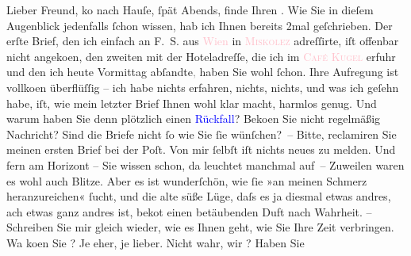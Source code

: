 \pstart
           Lieber Freund, ko{\geminationm} nach
               Hauſe, ſpät Abends, finde Ihren \label{K_L02951-1v}\label{K_L02951-1h}. Wie Sie in dieſem Augenblick jedenfalls ſchon wissen, hab ich Ihnen bereits
               2mal geſchrieben. Der erſte {\pb}Brief, den ich
               einfach an \textsc{F. S.} aus \textcolor{pink}{Wien}{}\ledrightnote{\textcolor{pink}{Wien}} in \textsc{\textcolor{pink}{Miskolez}{}\ledrightnote{\textcolor{pink}{Miskolc}}} adreſſirte, iſt offenbar nicht angeko{\geminationm}en, den
               zweiten mit der Hoteladreſſe, die ich im \textsc{\textcolor{pink}{Café Kugel}{}\ledrightnote{\textcolor{pink}{Café Kugel}}} erfuhr und den ich heute{ }Vormittag abſandte\textcolor{gray}{,} haben Sie wohl ſchon. Ihre
               Aufregung ist vollko{\geminationm}en {\pb}überflüſſig – ich habe nichts erfahren,
               nichts, nichts, und was ich geſehn habe, iſt, wie mein letzter Brief Ihnen wohl klar
               macht, harmlos genug. Und warum haben Sie denn plötzlich einen \textcolor{blue}{Rückfall}{}\ledrightnote{{$\rightarrow$}\textcolor{blue}{Bertha Karlsburg}}? Beko{\geminationm}en­ Sie nicht regelmäßig Nachricht? {\pb}Sind die Briefe nicht ſo wie Sie ſie
               wünſchen? – Bitte, reclamiren Sie meinen ersten Brief bei der Poſt. Von mir ſelbſt iſt
               nichts neues zu melden. Und fern am Horizont – Sie wissen schon, da leuchtet {\pb}\label{K_L02951-2v}\label{K_L02951-2h} manchmal
                  auf{\dotstwo} – Zuweilen waren es wohl auch Blitze. Aber es ist
               wunderſchön, wie ſie »an meinen Schmerz heranzureichen« ſucht, und die alte süße
               Lüge, daſs es ja diesmal etwas andres, ach etwas ganz andres ist, beko{\geminationm}t {\pb}einen
               betäubenden Duft nach Wahrheit. – Schreiben Sie mir gleich wieder, wie es Ihnen geht,
               wie Sie Ihre Zeit verbringen. Wa{\geminationn} ko{\geminationm}en Sie \label{K_L02951-3v}\label{K_L02951-3h}? Je eher, je lieber. Nicht wahr, wir \label{K_L02951-4v}\label{K_L02951-4h}? Haben {\pb}Sie
